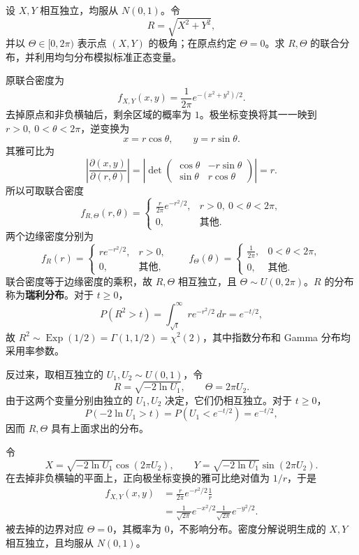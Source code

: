 \begin{example}[标准正态变量的极坐标变换]
设 $X,Y$ 相互独立，均服从 $N(0,1)$。令
\[
R=\sqrt{X^2+Y^2},
\]
并以 $\Theta\in[0,2\pi)$ 表示点 $(X,Y)$ 的极角；在原点约定 $\Theta=0$。求 $R,\Theta$ 的联合分布，并利用均匀分布模拟标准正态变量。

原联合密度为
\[
f_{X,Y}(x,y)=\frac{1}{2\pi}e^{-(x^2+y^2)/2}.
\]
去掉原点和非负横轴后，剩余区域的概率为 $1$。极坐标变换将其一一映到 $r>0,\ 0<\theta<2\pi$，逆变换为
\[
x=r\cos\theta,\qquad y=r\sin\theta.
\]
其雅可比为
\[
\left|\frac{\partial(x,y)}{\partial(r,\theta)}\right|
=\left|\det
\begin{pmatrix}
\cos\theta&-r\sin\theta\\
\sin\theta&r\cos\theta
\end{pmatrix}\right|=r.
\]
所以可取联合密度
\[
f_{R,\Theta}(r,\theta)=
\begin{cases}
\displaystyle\frac{r}{2\pi}e^{-r^2/2},&r>0,\ 0<\theta<2\pi,\\
0,&\text{其他}.
\end{cases}
\]
两个边缘密度分别为
\[
f_R(r)=
\begin{cases}re^{-r^2/2},&r>0,\\0,&\text{其他},\end{cases}
\qquad
f_\Theta(\theta)=
\begin{cases}\displaystyle\frac{1}{2\pi},&0<\theta<2\pi,\\0,&\text{其他}.\end{cases}
\]
联合密度等于边缘密度的乘积，故 $R,\Theta$ 相互独立，且 $\Theta\sim U(0,2\pi)$。$R$ 的分布称为\textbf{瑞利分布}。对于 $t\geq0$，
\[
P(R^2>t)=\int_{\sqrt t}^{\infty}re^{-r^2/2}\,dr=e^{-t/2},
\]
故 $R^2\sim\operatorname{Exp}(1/2)=\Gamma(1,1/2)=\chi^2(2)$，其中指数分布和 Gamma 分布均采用率参数。

反过来，取相互独立的 $U_1,U_2\sim U(0,1)$，令
\[
R=\sqrt{-2\ln U_1},\qquad \Theta=2\pi U_2.
\]
由于这两个变量分别由独立的 $U_1,U_2$ 决定，它们仍相互独立。对于 $t\geq0$，
\[
P(-2\ln U_1>t)=P(U_1<e^{-t/2})=e^{-t/2},
\]
因而 $R,\Theta$ 具有上面求出的分布。

令
\[
X=\sqrt{-2\ln U_1}\cos(2\pi U_2),\qquad
Y=\sqrt{-2\ln U_1}\sin(2\pi U_2).
\]
在去掉非负横轴的平面上，正向极坐标变换的雅可比绝对值为 $1/r$，于是
\begin{align*}
f_{X,Y}(x,y)
&=\frac{r}{2\pi}e^{-r^2/2}\frac1r\\
&=\frac{1}{\sqrt{2\pi}}e^{-x^2/2}
  \frac{1}{\sqrt{2\pi}}e^{-y^2/2}.
\end{align*}
被去掉的边界对应 $\Theta=0$，其概率为 $0$，不影响分布。密度分解说明生成的 $X,Y$ 相互独立，且均服从 $N(0,1)$。
\end{example}

